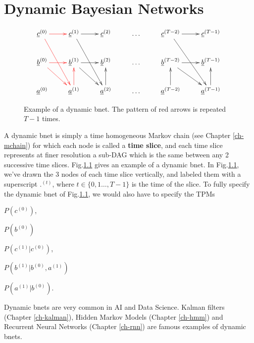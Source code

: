 \chapter{Dynamic Bayesian Networks}
\label{ch-dyn-bnet}

\begin{figure}
$$
\xymatrix{
\rvc^{(0)}\ar@[red][r]\ar@[red][rdd]
&\rvc^{(1)}\ar[r]\ar[rdd]
&\rvc^{(2)}
&\ldots
&\rvc^{(T-2)}\ar[r]\ar[rdd]
&\rvc^{(T-1)}
\\
\rvb^{(0)}\ar@[red][rd]\ar@[red][r]
&\rvb^{(1)}\ar[rd]\ar[r]
&\rvb^{(2)}
&\ldots
&\rvb^{(T-2)}\ar[rd]\ar[r]
&\rvb^{(T-1)}
\\
\rva^{(0)}
&\rva^{(1)}\ar@[red][u]
&\rva^{(2)}\ar[u]
&\ldots
&\rva^{(T-2)}\ar[u]
&\rva^{(T-1)}\ar[u]
}$$
\caption{
Example of a dynamic bnet. The 
pattern of red arrows is repeated $T-1$ times.
}
\label{fig-dyn-bnet}
\end{figure}

A dynamic bnet is simply
a time homogeneous Markov chain (see Chapter
\ref{ch-mchain})
for which each node is 
called a {\bf time slice},
and each time slice 
represents
at finer resolution a sub-DAG
which is the same 
between any
2 successive time slices.
Fig.\ref{fig-dyn-bnet} gives an example
of a dynamic bnet.
In Fig.\ref{fig-dyn-bnet},
we've drawn the 3 nodes of
each time slice vertically,
and labeled them
with a superscript ${.}^{(t)}$,
where $t\in \{
0,1 \ldots, T-1\}$ 
is the time
of the slice.
To fully 
specify the
dynamic bnet
of Fig.\ref{fig-dyn-bnet},
we would also have to specify
the TPMs 

$P(c^{(0)})$, 

$P(b^{(0)})$

$P(c^{(1)}|c^{(0)})$,
 
$P(b^{(1)}|b^{(0)}, a^{(1)})$

$P(a^{(1)}|b^{(0)})$.

Dynamic
bnets 
are very common
in AI and Data Science.
Kalman filters (Chapter \ref{ch-kalman}),
Hidden Markov Models (Chapter \ref{ch-hmm})
and
Recurrent Neural Networks 
(Chapter \ref{ch-rnn})
are famous examples of dynamic
bnets.

